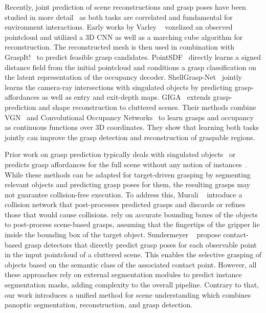 \documentclass[letterpaper, 10 pt, conference]{ieeeconf}  %
\begin{document}
Recently, joint prediction of scene reconstructions and grasp poses have been studied in more detail~\cite{Jiang2021SynergiesBA, varley2017shape, van2020learning, ChavanDafle2021SimultaneousOR} as both tasks are correlated and fundamental for environment interactions.
Early works by Varley \etal{}~\cite{varley2017shape} voxelized an observed pointcloud and utilized a 3D CNN as well as a marching cube algorithm for reconstruction.
The reconstructed mesh is then used in combination with GraspIt!~\cite{miller2004graspit} to predict feasible grasp candidates.
PointSDF~\cite{van2020learning} directly learns a signed distance field from the initial pointcloud and conditions a grasp classification on the latent representation of the occupancy decoder.
ShellGrasp-Net~\cite{ChavanDafle2021SimultaneousOR} jointly learns the camera-ray intersections with singulated objects by predicting grasp-affordances as well as entry and exit-depth maps.
GIGA~\cite{Jiang2021SynergiesBA} extends grasp-prediction and shape reconstruction to cluttered scenes.
Their methods combine VGN~\cite{Breyer2021VolumetricGN} and Convolutional Occupancy Networks~\cite{peng2020convolutional} to learn grasps and occupancy as continuous functions over 3D coordinates. They show that learning both tasks jointly can improve the grasp detection and reconstruction of graspable regions.

Prior work on grasp prediction typically deals with singulated objects~\cite{varley2017shape, ChavanDafle2021SimultaneousOR,jeng2021gdn} or predicts grasp affordances for the full scene without any notion of instances~\cite{Breyer2021VolumetricGN, Jiang2021SynergiesBA, liang2019pointnetgpd}.
While these methods can be adapted for target-driven grasping by segmenting relevant objects and predicting grasp poses for them, the resulting grasps may not guarantee collision-free execution.
To address this, Murali \etal{}~\cite{murali20206} introduce a collision network that post-processes predicted grasps and discards or refines those that would cause collisions.
\cite{breyer2022closed} rely on accurate bounding boxes of the objects to post-process scene-based grasps,
assuming that the fingertips of the gripper lie inside the bounding box of the target object.
Sundermeyer \etal{}~\cite{Sundermeyer2021ContactGraspNetE6} propose contact-based grasp detectors that directly predict grasp poses for each observable point in the input pointcloud of a cluttered scene.
This enables the selective grasping of objects based on the semantic class of the associated contact point.
However, all these approaches rely on external segmentation modules to predict instance segmentation masks, adding complexity to the overall pipeline. Contrary to that, our work introduces a unified method for scene understanding which combines panoptic segmentation, reconstruction, and grasp detection.
\end{document}
